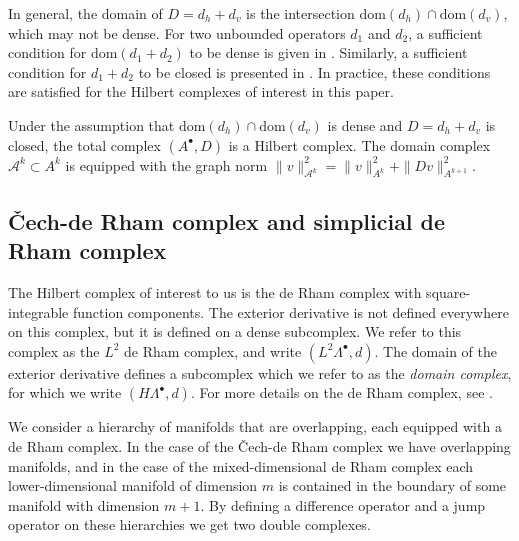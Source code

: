 \documentclass[reqno]{amsart}
\numberwithin{equation}{section}
\theoremstyle{definition}
\newcommand{\Ac}{\mathcal{A}}
\newcommand{\dom}{\mathrm{dom}}
\begin{document}
In general, the domain of $D = d_h + d_v$ is the intersection $\dom (d_h) \cap \dom(d_v)$, which may not be dense. For two unbounded operators $d_1$ and $d_2$, a sufficient condition for $\dom(d_1 + d_2)$ to be dense is given in \cite{lennon1974sums}. Similarly, a sufficient condition for $d_1 + d_2$ to be closed is presented in \cite[Chapter 4, Theorem 1.1]{kato2013perturbation}. In practice, these conditions are satisfied for the Hilbert complexes of interest in this paper.

Under the assumption that $\dom (d_h) \cap \dom(d_v)$ is dense and $D = d_h + d_v$ is closed, the total complex $(A^\bullet, D)$ is a Hilbert complex. The domain complex $\Ac^k \subset A^k$ is equipped with the graph norm $\|v\|^2_{\Ac^k} = \|v\|^2_{A^k} + \|Dv\|^2_{A^{k+1}}$.





\subsection{\v{C}ech-de Rham complex and simplicial de Rham complex}
The Hilbert complex of interest to us is the de Rham complex with square-integrable function components. The exterior derivative is not defined everywhere on this complex, but it is defined on a dense subcomplex. We refer to this complex as the $L^2$ de Rham complex, and write $(L^2\Lambda^\bullet, d)$. The domain of the exterior derivative defines a subcomplex which we refer to as the \emph{domain complex}, for which we write $(H\Lambda^\bullet, d)$. For more details on the de Rham complex, see \cite[Chapter 6]{arnoldFEEC}.

We consider a hierarchy of manifolds that are overlapping, each equipped with a de Rham complex. In the case of the \v{C}ech-de Rham complex we have overlapping manifolds, and in the case of the mixed-dimensional de Rham complex each lower-dimensional manifold of dimension $m$ is contained in the boundary of some manifold with dimension $m+1$. By defining a difference operator and a jump operator on these hierarchies we get two double complexes.
\end{document}

